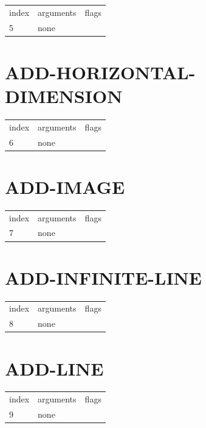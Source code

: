 \documentclass[10pt]{report}
\begin{document}
\begin{center}
\begin{tabular}{l | l | l}
index & arguments & flags \\
5 & none & 
\end{tabular}
\end{center}

\section{ADD-HORIZONTAL-DIMENSION}

\begin{center}
\begin{tabular}{l | l | l}
index & arguments & flags \\
6 & none & 
\end{tabular}
\end{center}

\section{ADD-IMAGE}

\begin{center}
\begin{tabular}{l | l | l}
index & arguments & flags \\
7 & none & 
\end{tabular}
\end{center}

\section{ADD-INFINITE-LINE}

\begin{center}
\begin{tabular}{l | l | l}
index & arguments & flags \\
8 & none & 
\end{tabular}
\end{center}

\section{ADD-LINE}

\begin{center}
\begin{tabular}{l | l | l}
index & arguments & flags \\
9 & none & 
\end{tabular}
\end{center}
\end{document}
